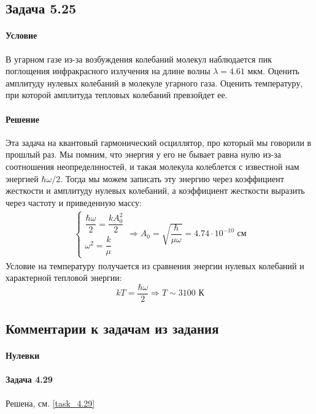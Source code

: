 \documentclass[12pt]{article}
\begin{document}
\subsection{Задача 5.25}
\label{task_5.25}
\paragraph{Условие} В угарном газе из-за возбуждения колебаний молекул наблюдается  пик поглощения инфракрасного излучения на длине волны $\lambda = 4.61$ мкм. Оценить амплитуду нулевых колебаний в молекуле угарного газа. Оценить температуру, при которой амплитуда тепловых колебаний превзойдет ее.
\paragraph{Решение}
Эта задача на квантовый гармонический осциллятор, про который мы говорили в прошлый раз. Мы помним, что энергия у его не бывает равна нулю из-за соотношения неопределнностей, и такая молекула колеблется с известной нам энергией $\hbar \omega/2$. Тогда мы можем записать эту энергию через коэффициент жесткости и амплитуду нулевых колебаний, а коэффициент жесткости выразить через частоту и приведенную массу:
\begin{gather*}
    \begin{cases}
       \dfrac{\hbar \omega}{2} = \dfrac{kA_0^2}{2}\\
       \omega^2 = \dfrac{k}{\mu}
    \end{cases} \Rightarrow A_0 = \sqrt{\dfrac{\hbar}{\mu \omega}} = 4.74\cdot 10^{-10} \text{ см}
\end{gather*}
Условие на температуру получается из сравнения энергии нулевых колебаний и характерной тепловой энергии:
\begin{equation*}
    kT = \dfrac{\hbar \omega}{2} \Rightarrow T\sim 3100 \text{ К}
\end{equation*}


\subsection{Комментарии к задачам из задания}
\paragraph{Нулевки} 
\paragraph{Задача 4.29} Решена, см. \ref{task_4.29}
\end{document}
